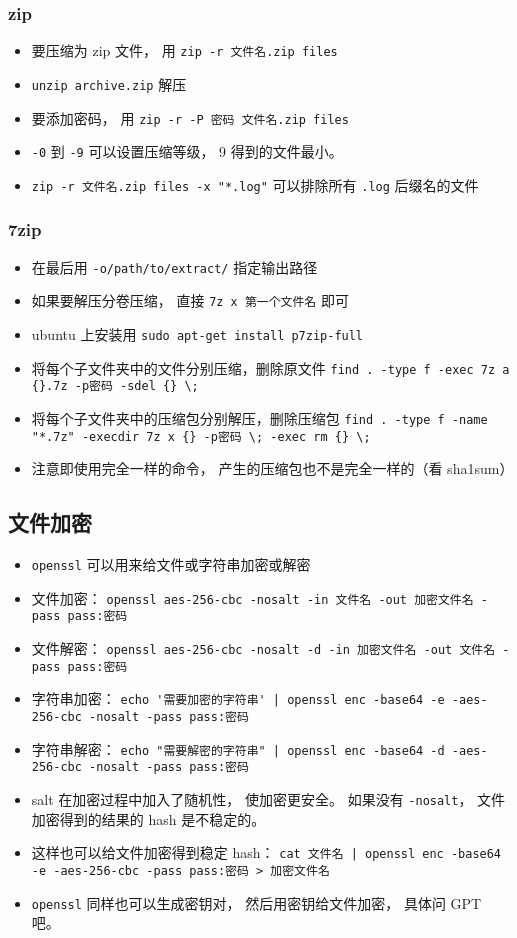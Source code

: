 \subsubsection{zip}
\begin{itemize}
\item 要压缩为 zip 文件， 用 \verb|zip -r 文件名.zip files|
\item \verb|unzip archive.zip| 解压
\item 要添加密码， 用 \verb|zip -r -P 密码 文件名.zip files|
\item \verb|-0| 到 \verb|-9| 可以设置压缩等级， 9 得到的文件最小。
\item \verb|zip -r 文件名.zip files -x "*.log"| 可以排除所有 \verb|.log| 后缀名的文件
\end{itemize}

\subsubsection{7zip}
\begin{itemize}
\item 在最后用 \verb`-o/path/to/extract/` 指定输出路径
\item 如果要解压分卷压缩， 直接 \verb`7z x 第一个文件名` 即可
\item ubuntu 上安装用 \verb`sudo apt-get install p7zip-full`

\item 将每个子文件夹中的文件分别压缩，删除原文件
\verb`find . -type f -exec 7z a {}.7z -p密码 -sdel {} \;`
\item 将每个子文件夹中的压缩包分别解压，删除压缩包
\verb`find . -type f -name "*.7z" -execdir 7z x {} -p密码 \; -exec rm {} \;`
\item 注意即使用完全一样的命令， 产生的压缩包也不是完全一样的（看 sha1sum）
\end{itemize}

\subsection{文件加密}
\begin{itemize}
\item \verb|openssl| 可以用来给文件或字符串加密或解密
\item 文件加密： \verb`openssl aes-256-cbc -nosalt -in 文件名 -out 加密文件名 -pass pass:密码`
\item 文件解密： \verb`openssl aes-256-cbc -nosalt -d -in 加密文件名 -out 文件名 -pass pass:密码`
\item 字符串加密： \verb`echo '需要加密的字符串' | openssl enc -base64 -e -aes-256-cbc -nosalt -pass pass:密码`
\item 字符串解密： \verb`echo "需要解密的字符串" | openssl enc -base64 -d -aes-256-cbc -nosalt -pass pass:密码`
\item salt 在加密过程中加入了随机性， 使加密更安全。 如果没有 \verb|-nosalt|， 文件加密得到的结果的 hash 是不稳定的。
\item 这样也可以给文件加密得到稳定 hash： \verb`cat 文件名 | openssl enc -base64 -e -aes-256-cbc -pass pass:密码 > 加密文件名`
\item \verb|openssl| 同样也可以生成密钥对， 然后用密钥给文件加密， 具体问 GPT 吧。
\end{itemize}

